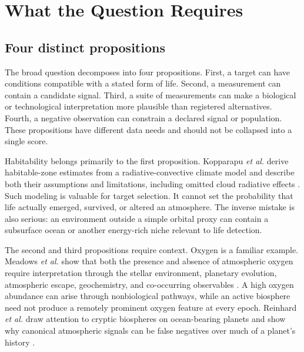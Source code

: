 \documentclass[conference]{IEEEtran}
\begin{document}
\section{What the Question Requires}

\subsection{Four distinct propositions}

The broad question decomposes into four propositions. First, a target can have conditions compatible with a stated form of life. Second, a measurement can contain a candidate signal. Third, a suite of measurements can make a biological or technological interpretation more plausible than registered alternatives. Fourth, a negative observation can constrain a declared signal or population. These propositions have different data needs and should not be collapsed into a single score.

Habitability belongs primarily to the first proposition. Kopparapu \emph{et al.} derive habitable-zone estimates from a radiative-convective climate model and describe both their assumptions and limitations, including omitted cloud radiative effects \cite{kopparapu2013}. Such modeling is valuable for target selection. It cannot set the probability that life actually emerged, survived, or altered an atmosphere. The inverse mistake is also serious: an environment outside a simple orbital proxy can contain a subsurface ocean or another energy-rich niche relevant to life detection.

The second and third propositions require context. Oxygen is a familiar example. Meadows \emph{et al.} show that both the presence and absence of atmospheric oxygen require interpretation through the stellar environment, planetary evolution, atmospheric escape, geochemistry, and co-occurring observables \cite{meadows2018}. A high oxygen abundance can arise through nonbiological pathways, while an active biosphere need not produce a remotely prominent oxygen feature at every epoch. Reinhard \emph{et al.} draw attention to cryptic biospheres on ocean-bearing planets and show why canonical atmospheric signals can be false negatives over much of a planet's history \cite{reinhard2017}.
\end{document}
